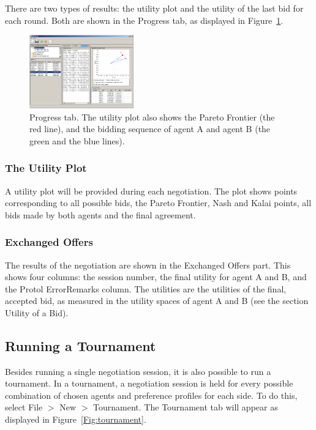 \documentclass[]{article}
\begin{document}
There are two types of results: the utility plot and the utility of the last bid for each round. Both are shown in the Progress tab, as displayed in Figure~\ref{Fig:progress}.

\begin{figure}[htb]
	\centering
	\includegraphics[width=0.4\textwidth]{media/image15.png}
\caption{Progress tab. The utility plot also shows the Pareto Frontier (the red line), and the bidding sequence of agent A and agent B (the green and the blue lines).}\label{Fig:progress}
\end{figure}

\subsubsection{The Utility Plot}

A utility plot will be provided during each negotiation. The plot shows points corresponding to all possible bids, the Pareto Frontier, Nash and Kalai points, all bids made by both agents and the final agreement.

\subsubsection{Exchanged Offers}

The results of the negotiation are shown in the Exchanged Offers part. This shows four columns: the session number, the final utility for agent A and B, and the Protol ErrorRemarks column. The utilities are the utilities of the final, accepted bid, as measured in the utility spaces of agent A and B (see the section Utility of a Bid).

\subsection{Running a Tournament}

Besides running a single negotiation session, it is also possible to run a tournament. In a tournament, a negotiation session is held for every possible combination of chosen agents and preference profiles for each side. To do this, select File $>$ New $>$ Tournament. The Tournament tab will appear as displayed in Figure~\ref{Fig:tournament}. 
 
\end{document}
